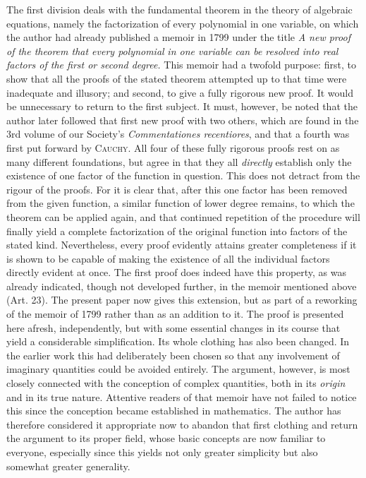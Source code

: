 The first division deals with the fundamental theorem in the theory of algebraic equations, namely the factorization of every polynomial in one variable, on which the author had already published a memoir in 1799 under the title \textit{A new proof of the theorem that every polynomial} \textit{in one variable can be resolved into real factors of the first or second degree.} This memoir had a twofold purpose: first, to show that all the proofs of the stated theorem attempted up to that time were inadequate and illusory; and second, to give a fully rigorous new proof. It would be unnecessary to return to the first subject. It must, however, be noted that the author later followed that first new proof with two others, which are found in the 3rd volume
of our Society's \textit{Commentationes recentiores}, and that a fourth was first put forward by \textsc{Cauchy}. All four of these fully rigorous proofs rest on as many different foundations, but agree in that they all \textit{directly} establish only the existence of one factor of the function in question. This does not detract from the rigour of the proofs. For it is clear that, after this one factor has been removed from the given function, a similar function of lower degree remains, to which the theorem can be applied again, and that continued repetition of the procedure will finally yield a complete factorization of the original function into factors of the stated kind. Nevertheless, every proof evidently attains greater completeness if it is shown to be capable of making the existence of all the individual factors directly evident at once. The first proof does indeed have this property, as was already indicated, though not developed further, in the memoir mentioned above (Art. 23). The present paper now gives this extension, but as part of a reworking of the memoir of 1799 rather than as an addition to it. The proof is presented here afresh, independently, but with some essential changes in its course that yield a considerable simplification. Its whole clothing has also been changed. In the earlier work this had deliberately been chosen so that any involvement of imaginary quantities could be avoided entirely. The argument, however, is most closely connected with the conception of complex quantities, both in its \textit{origin} and in its true nature. Attentive readers of that memoir have not failed to notice this since the conception became established in mathematics. The author has therefore considered it appropriate now to abandon that first clothing and return the argument to its proper field, whose basic concepts are now familiar to everyone, especially since this yields not only greater simplicity but also somewhat greater generality.

